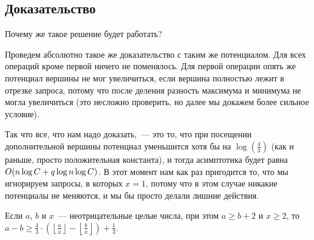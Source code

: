 \subsection{Доказательство}

Почему же такое решение будет работать?

Проведем абсолютно такое же доказательство с таким же потенциалом. Для всех операций кроме первой ничего не поменялось. Для первой операции опять же потенциал вершины не мог увеличиться, если вершина полностью лежит в отрезке запроса, потому что после деления разность максимума и минимума не могла увеличиться (это несложно проверить, но далее мы докажем более сильное условие).

Так что все, что нам надо доказать,~--- это то, что при посещении дополнительной вершины потенциал уменьшится хотя бы на $\log (\frac{4}{3})$ (как и раньше, просто положительная константа), и тогда асимптотика будет равна $O(n \log C + q \log n \log C)$. В этот момент нам как раз пригодится то, что мы игнорируем запросы, в которых $x = 1$, потому что в этом случае никакие потенциалы не меняются, и мы бы просто делали лишние действия.

\begin{theorem}
    Если $a$, $b$ и $x$~--- неотрицательные целые числа, при этом $a \ge b + 2$ и $x \ge 2$, то $a - b \ge \frac{4}{3} \cdot \left( \left\lfloor \frac{a}{x} \right\rfloor - \left\lfloor \frac{b}{x} \right\rfloor \right) + \frac{1}{3}$.
\end{theorem}

